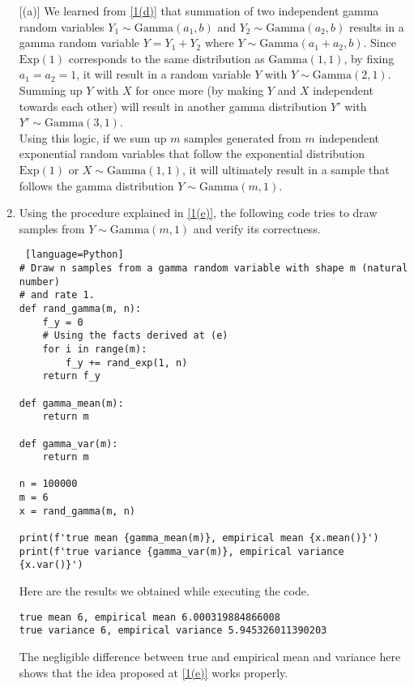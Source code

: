 \begin{enumerate} [(a)]
	We learned from \ref{1(d)} that summation of two independent gamma random variables $Y_1 \sim \mathrm{Gamma}(a_1,b)$ and $Y_2 \sim \mathrm{Gamma}(a_2,b)$ results in a gamma random variable $Y = Y_1 + Y_2$ where $Y \sim \mathrm{Gamma}(a_1 + a_2, b)$.
	Since $\mathrm{Exp}(1)$ corresponds to the same distribution as $\mathrm{Gamma}(1,1)$, by fixing $a_1=a_2=1$, it will result in a random variable $Y$ with $Y \sim \mathrm{Gamma}(2,1)$. Summing up $Y$ with $X$ for once more (by making $Y$ and $X$ independent towards each other) will result in another gamma distribution $Y'$ with $Y' \sim \mathrm{Gamma}(3,1)$. \\
	Using this logic, if we sum up $m$ samples generated from $m$ independent exponential random variables that follow the exponential distribution $\mathrm{Exp}(1)$ or $X \sim \mathrm{Gamma}(1,1)$, it will ultimately result in a sample that follows the gamma distribution $Y \sim \mathrm{Gamma}(m,1)$.
	\item \label{1(f)} Using the procedure explained in \ref{1(e)}, the following code tries to draw samples from $Y \sim \mathrm{Gamma}(m,1)$ and verify its correctness.
	\begin{lstlisting} [language=Python]
# Draw n samples from a gamma random variable with shape m (natural number) 
# and rate 1.
def rand_gamma(m, n):
	f_y = 0
	# Using the facts derived at (e)
	for i in range(m):
		f_y += rand_exp(1, n)
	return f_y

def gamma_mean(m):
	return m

def gamma_var(m):
	return m

n = 100000
m = 6
x = rand_gamma(m, n)

print(f'true mean {gamma_mean(m)}, empirical mean {x.mean()}')
print(f'true variance {gamma_var(m)}, empirical variance {x.var()}')
	\end{lstlisting}
	Here are the results we obtained while executing the code.
	\begin{verbatim}
true mean 6, empirical mean 6.000319884866008
true variance 6, empirical variance 5.945326011390203
	\end{verbatim}
	The negligible difference between true and empirical mean and variance here shows that the idea proposed at \ref{1(e)} works properly.
\end{enumerate}